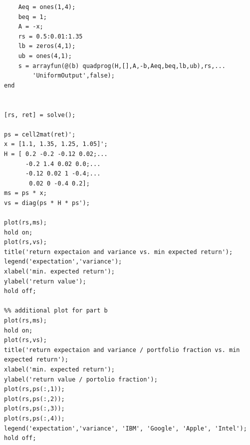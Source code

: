 \documentclass[12pt,letter]{article}
\begin{document}
\begin{enumerate}
\begin{verbatim}
    Aeq = ones(1,4);
    beq = 1;
    A = -x;
    rs = 0.5:0.01:1.35
    lb = zeros(4,1);
    ub = ones(4,1);
    s = arrayfun(@(b) quadprog(H,[],A,-b,Aeq,beq,lb,ub),rs,...
        'UniformOutput',false); 
end


[rs, ret] = solve();

ps = cell2mat(ret)';
x = [1.1, 1.35, 1.25, 1.05]'; 
H = [ 0.2 -0.2 -0.12 0.02;...
      -0.2 1.4 0.02 0.0;...
      -0.12 0.02 1 -0.4;...
       0.02 0 -0.4 0.2];
ms = ps * x;
vs = diag(ps * H * ps');

plot(rs,ms);
hold on;
plot(rs,vs);
title('return expectaion and variance vs. min expected return');
legend('expectation','variance');
xlabel('min. expected return');
ylabel('return value');
hold off;

%% additional plot for part b
plot(rs,ms);
hold on;
plot(rs,vs);
title('return expectaion and variance / portfolio fraction vs. min expected return');
xlabel('min. expected return');
ylabel('return value / portolio fraction');
plot(rs,ps(:,1));
plot(rs,ps(:,2));
plot(rs,ps(:,3));
plot(rs,ps(:,4));
legend('expectation','variance', 'IBM', 'Google', 'Apple', 'Intel');
hold off;
\end{verbatim}
  
  \pagebreak
  

\end{enumerate}
\end{document}
